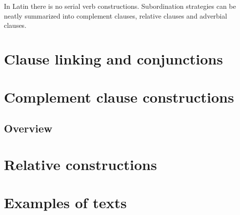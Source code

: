 \documentclass[a4paper, oneside]{report}
\begin{document}
In Latin there is no serial verb constructions.
Subordination strategies can be neatly summarized into 
complement clauses, relative clauses and adverbial clauses.

\chapter{Clause linking and conjunctions}



\chapter{Complement clause constructions}\label{chap:complement-clause-construct}

\section{Overview}\label{sec:complement-clause-construct-overview}

\chapter{Relative constructions}\label{sec:relative-clause}

\chapter{Examples of texts}



\end{document}
